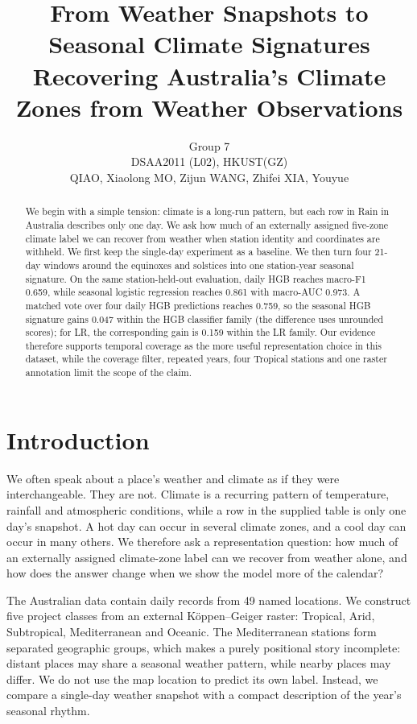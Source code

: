 \documentclass{article}
\title{From Weather Snapshots to Seasonal Climate Signatures\\Recovering Australia's Climate Zones from Weather Observations}
\author{Group 7\\DSAA2011 (L02), HKUST(GZ)\\QIAO, Xiaolong \quad MO, Zijun \quad WANG, Zhifei \quad XIA, Youyue}
\newcommand{\DailyHGB}{0.659}
\newcommand{\SeasonLR}{0.861}
\newcommand{\SeasonLRAUC}{0.973}
\newcommand{\MatchedDaily}{0.759}
\newcommand{\SeasonGain}{0.047}
\newcommand{\SeasonLRGain}{0.159}
\begin{document}
\maketitle

\begin{abstract}
We begin with a simple tension: climate is a long-run pattern, but each row in Rain in Australia describes only one day. We ask how much of an externally assigned five-zone climate label we can recover from weather when station identity and coordinates are withheld. We first keep the single-day experiment as a baseline. We then turn four 21-day windows around the equinoxes and solstices into one station-year seasonal signature. On the same station-held-out evaluation, daily HGB reaches macro-F1 \DailyHGB{}, while seasonal logistic regression reaches \SeasonLR{} with macro-AUC \SeasonLRAUC{}. A matched vote over four daily HGB predictions reaches \MatchedDaily{}, so the seasonal HGB signature gains \SeasonGain{} within the HGB classifier family (the difference uses unrounded scores); for LR, the corresponding gain is \SeasonLRGain{} within the LR family. Our evidence therefore supports temporal coverage as the more useful representation choice in this dataset, while the coverage filter, repeated years, four Tropical stations and one raster annotation limit the scope of the claim.
\end{abstract}

\section{Introduction}
We often speak about a place's weather and climate as if they were interchangeable. They are not. Climate is a recurring pattern of temperature, rainfall and atmospheric conditions, while a row in the supplied table is only one day's snapshot. A hot day can occur in several climate zones, and a cool day can occur in many others. We therefore ask a representation question: how much of an externally assigned climate-zone label can we recover from weather alone, and how does the answer change when we show the model more of the calendar?

The Australian data contain daily records from 49 named locations. We construct five project classes from an external Köppen--Geiger raster: Tropical, Arid, Subtropical, Mediterranean and Oceanic. The Mediterranean stations form separated geographic groups, which makes a purely positional story incomplete: distant places may share a seasonal weather pattern, while nearby places may differ. We do not use the map location to predict its own label. Instead, we compare a single-day weather snapshot with a compact description of the year's seasonal rhythm.
\end{document}
